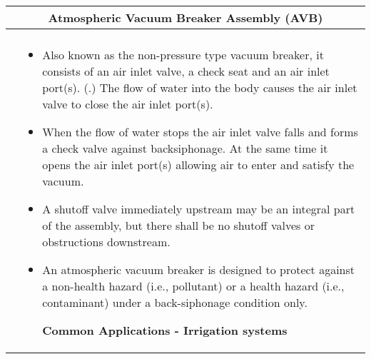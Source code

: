 \begin{landscape}
\begin{table}[h!]
\begin{tabular}{|c m{20cm} |}
\multicolumn{2}{c}{Atmospheric Vacuum Breaker Assembly (AVB)}\\ \hline \index{Backflow!Prevention devices!Atmospheric vacuum breaker assembly (AVB) }
    \begin{minipage}{.3\textwidth}
     \texttt{[image: AtmosphericVacuumBreaker(3)]}\\
    \end{minipage}
     &
    \vspace{0.3cm}
\scriptsize{\begin{itemize}[topsep=5pt, partopsep=0pt]
\item Also known as the non-pressure type vacuum breaker, it consists of an air inlet valve, a check seat and an air inlet port(s). (.) The flow of water into the body causes the air inlet valve to close the air inlet port(s). 
\item When the flow of water stops the air inlet valve falls and forms a check valve against backsiphonage. At the same time it opens the air inlet port(s) allowing air to enter and satisfy the vacuum. 
\item A shutoff valve immediately upstream may be an integral part of the assembly, but there shall be no shutoff valves or obstructions downstream. 
\item An atmospheric vacuum breaker is designed to protect against a non-health hazard (i.e., pollutant) or a health hazard (i.e., contaminant) under a back-siphonage condition only.

\textbf{Common Applications - Irrigation systems}


\end{itemize}}
    

\end{tabular}
\end{table}
\end{landscape}
